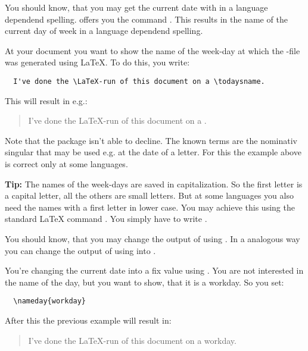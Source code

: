 \begin{Declaration}
\end{Declaration}%
%
You should know, that you may get the current date with
 in a language dependend
spelling.  offers you the command . This
results in the name of the current day of week in a language dependend
spelling.

\begin{Example}
  At your document you want to show the name of the week-day at which
  the -file was generated using \LaTeX. To do this, you
  write:
\begin{lstlisting}
  I've done the \LaTeX-run of this document on a \todaysname.
\end{lstlisting}
  This will result in e.g.:
  \begin{quote}
    I've done the \LaTeX-run of this document on a \todaysname.
  \end{quote}
\end{Example}

Note that the package isn't able to decline. The known terms are the nominativ
singular that may be used e.g. at the date of a letter. For this the example
above is correct only at some languages.

\begin{Explain}
  \textbf{Tip:} The names of the week-days are saved in
  capitalization. So the first letter is a capital letter, all the
  others are small letters. But at some languages you also need the
  names with a first letter in lower case. You may achieve this using
  the standard \LaTeX{} command . You simply have
  to write .
\end{Explain}

\begin{Declaration}
\end{Declaration}%
%
You should know, that you may change the output of  using
. In a analogous way you can change the
output of  using  into .
\begin{Example}
  You're changing the current date into a fix value using
  . You are not interested in the name of the day, but
  you want to show, that it is a workday. So you set:
\begin{lstlisting}
  \nameday{workday}
\end{lstlisting}
  After this the previous example will result in:
  \begin{quote}
    I've done the \LaTeX-run of this document on a workday.
  \end{quote}
\end{Example}

